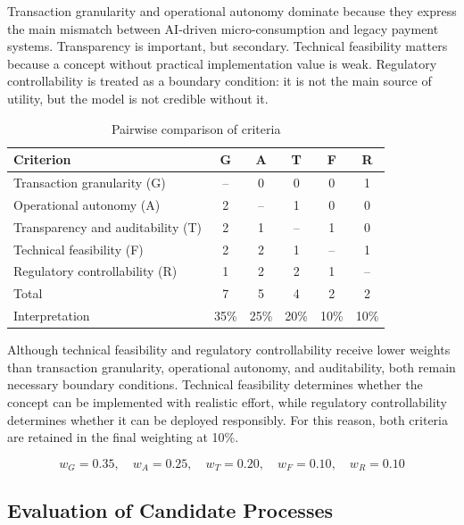 \documentclass[12pt,a4paper,oneside]{article}
\theoremstyle{definition}
\theoremstyle{plain}
\begin{document}
Transaction granularity and operational autonomy dominate because they express the main mismatch between AI-driven micro-consumption and legacy payment systems. Transparency is important, but secondary. Technical feasibility matters because a concept without practical implementation value is weak. Regulatory controllability is treated as a boundary condition: it is not the main source of utility, but the model is not credible without it.

\begin{table}[H]
\centering
\caption{Pairwise comparison of criteria}
\label{tab:pairwise_explicit}

\begin{tabular}{lccccc}
\toprule
\textbf{Criterion} & \textbf{G} & \textbf{A} & \textbf{T} & \textbf{F} & \textbf{R} \\
\midrule
Transaction granularity (G)       & -- & 0  & 0  & 0  & 1 \\
Operational autonomy (A)          & 2  & -- & 1  & 0  & 0 \\
Transparency and auditability (T) & 2  & 1  & -- & 1  & 0 \\
Technical feasibility (F)         & 2  & 2  & 1  & -- & 1 \\
Regulatory controllability (R)    & 1  & 2  & 2  & 1  & -- \\
\midrule
Total                             & 7  & 5  & 4  & 2  & 2 \\
Interpretation                    & 35\% & 25\% & 20\% & 10\% & 10\% \\
\bottomrule
\end{tabular}
\end{table}


Although technical feasibility and regulatory controllability receive lower weights than transaction granularity, operational autonomy, and auditability, both remain necessary boundary conditions. Technical feasibility determines whether the concept can be implemented with realistic effort, while regulatory controllability determines whether it can be deployed responsibly. For this reason, both criteria are retained in the final weighting at 10\%.


\[
w_G = 0.35,\quad
w_A = 0.25,\quad
w_T = 0.20,\quad
w_F = 0.10,\quad
w_R = 0.10
\]

\subsection{Evaluation of Candidate Processes}
\end{document}
